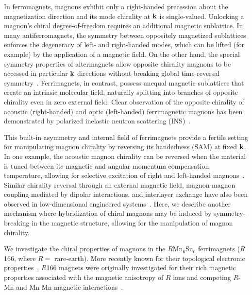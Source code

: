 \documentclass[
amsmath,amssymb,aps,showkeys, nofootinbib, twocolumn,superscriptaddress,longbibliography
]{revtex4-2}
\begin{document}
    In ferromagnets, magnons exhibit only a right-handed precession about the magnetization direction and its mode chirality at ${\bf k}$ is single-valued. Unlocking a magnon’s chiral degree-of-freedom requires an additional magnetic sublattice. In many antiferromagnets, the symmetry between oppositely magnetized sublattices enforces the degeneracy of left- and right-handed modes, which can be lifted (for example) by the application of a magnetic field. On the other hand, the special symmetry properties of altermagnets allow opposite chirality magnons to be accessed in particular ${\bf k}$ directions without breaking global time-reversal symmetry~\cite{vsmejkal2023chiral,PhysRevLettMnTe}.  Ferrimagnets, in contrast, possess unequal magnetic sublattices that create an intrinsic molecular field, naturally splitting into branches of opposite chirality even in zero external field.  Clear observation of the opposite chirality of acoustic (right-handed) and optic (left-handed) ferrimagnetic magnons has been demonstrated by polarized inelastic neutron scattering (INS)~\cite{nambu2020observation}.

    This built-in asymmetry and internal field of ferrimagnets provide a fertile setting for manipulating magnon chirality by reversing its handedness (SAM) at fixed ${\bf k}$.  In one example, the acoustic magnon chirality can be reversed when the material is tuned between its magnetic and angular momentum compensation temperature, allowing for selective excitation of right and left-handed magnons~\cite{kim2020distinct,mori2023magnetic,PhysRevLettWang,Yan25}. Similar chirality reversal through an external magnetic field, magnon-magnon coupling mediated by dipolar interactions, and interlayer exchange have also been observed in low-dimensional engineered systems~\cite{Shiota24,zhang2025switchable,PhysRevBLi,PhysRevBSud,liu2022, PhysRevLett2020, PhysRevLett2025, Duan25}. Here, we describe another mechanism where hybridization of chiral magnons may be induced by symmetry-breaking in the magnetic structure, allowing for the manipulation of magnon chirality.

    We investigate the chiral properties of magnons in the $R$Mn$_6$Sn$_6$ ferrimagnets ($R$166, where $R=$ rare-earth). More recently known for their topological electronic properties~\cite{yin2020quantum, ma2021rare, dhakal2021, Lee2023}, $R$166 magnets were originally investigated for their rich magnetic properties associated with the magnetic anisotropy of $R$ ions and competing $R$-Mn and Mn-Mn magnetic interactions~\cite{venturini1991, venturini1996, malaman1999,rosenfeld, PhysRevX_SXM, Riberolles24, kyle2024}.
\end{document}
